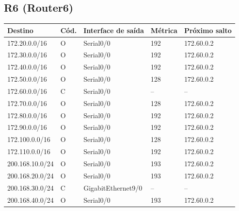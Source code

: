 \subsection*{R6 (Router6)}
\begin{tabular}{@{}llllp{3.6cm}@{}}\toprule Destino & Cód. & Interface de saída & Métrica & Próximo salto\\\midrule
172.20.0.0/16 & O & Serial0/0 & 192 & 172.60.0.2\\
172.30.0.0/16 & O & Serial0/0 & 192 & 172.60.0.2\\
172.40.0.0/16 & O & Serial0/0 & 192 & 172.60.0.2\\
172.50.0.0/16 & O & Serial0/0 & 128 & 172.60.0.2\\
172.60.0.0/16 & C & Serial0/0 & -- & --\\
172.70.0.0/16 & O & Serial0/0 & 128 & 172.60.0.2\\
172.80.0.0/16 & O & Serial0/0 & 192 & 172.60.0.2\\
172.90.0.0/16 & O & Serial0/0 & 192 & 172.60.0.2\\
172.100.0.0/16 & O & Serial0/0 & 128 & 172.60.0.2\\
172.110.0.0/16 & O & Serial0/0 & 192 & 172.60.0.2\\
200.168.10.0/24 & O & Serial0/0 & 193 & 172.60.0.2\\
200.168.20.0/24 & O & Serial0/0 & 193 & 172.60.0.2\\
200.168.30.0/24 & C & GigabitEthernet9/0 & -- & --\\
200.168.40.0/24 & O & Serial0/0 & 193 & 172.60.0.2\\
\bottomrule\end{tabular}

